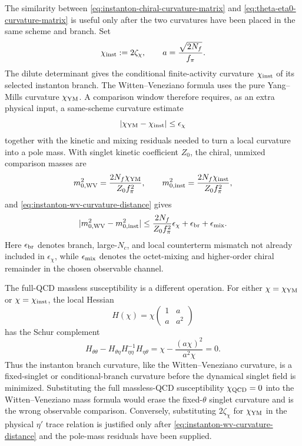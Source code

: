 \begin{controlledapproximation}
\label{ca:instanton-wv-comparison-window}
The similarity between \eqref{eq:instanton-chiral-curvature-matrix} and
\eqref{eq:theta-eta0-curvature-matrix} is useful only after the two
curvatures have been placed in the same scheme and branch.  Set
\[
  \chi_{\rm inst}:=2\zeta_\chi,
  \qquad
  a=\frac{\sqrt{2N_f}}{f_\pi}.
\]
The dilute determinant gives the conditional finite-activity curvature
\(\chi_{\rm inst}\) of its selected instanton branch.  The
Witten--Veneziano formula uses the pure Yang--Mills curvature
\(\chi_{\rm YM}\).  A comparison window therefore requires, as an extra
physical input, a same-scheme curvature estimate
\begin{equation}
  |\chi_{\rm YM}-\chi_{\rm inst}|\le \epsilon_\chi
  \label{eq:instanton-wv-curvature-distance}
\end{equation}
together with the kinetic and mixing residuals needed to turn a local
curvature into a pole mass.  With singlet kinetic coefficient \(Z_0\), the
chiral, unmixed comparison masses are
\[
  m_{0,{\rm WV}}^2
  =
  \frac{2N_f\chi_{\rm YM}}{Z_0f_\pi^2},
  \qquad
  m_{0,{\rm inst}}^2
  =
  \frac{2N_f\chi_{\rm inst}}{Z_0f_\pi^2},
\]
and \eqref{eq:instanton-wv-curvature-distance} gives
\begin{equation}
  |m_{0,{\rm WV}}^2-m_{0,{\rm inst}}^2|
  \le
  \frac{2N_f}{Z_0f_\pi^2}\epsilon_\chi
  +\epsilon_{\rm br}+\epsilon_{\rm mix}.
  \label{eq:instanton-wv-mass-comparison-bound}
\end{equation}
Here \(\epsilon_{\rm br}\) denotes branch, large-\(N_c\), and local
counterterm mismatch not already included in \(\epsilon_\chi\), while
\(\epsilon_{\rm mix}\) denotes the octet-mixing and higher-order chiral
remainder in the chosen observable channel.

The full-QCD massless susceptibility is a different operation.  For either
\(\chi=\chi_{\rm YM}\) or \(\chi=\chi_{\rm inst}\), the local Hessian
\[
  H(\chi)
  =
  \chi
  \begin{pmatrix}
    1&a\\
    a&a^2
  \end{pmatrix}
\]
has the Schur complement
\begin{equation}
  H_{\theta\theta}
  -
  H_{\theta\eta}H_{\eta\eta}^{-1}H_{\eta\theta}
  =
  \chi-\frac{(a\chi)^2}{a^2\chi}
  =
  0 .
  \label{eq:instanton-wv-massless-schur-zero}
\end{equation}
Thus the instanton branch curvature, like the Witten--Veneziano curvature, is
a fixed-singlet or conditional-branch curvature before the dynamical singlet
field is minimized.  Substituting the full massless-QCD susceptibility
\(\chi_{\rm QCD}=0\) into the Witten--Veneziano mass formula would erase the
fixed-\(\theta\) singlet curvature and is the wrong observable comparison.
Conversely, substituting \(2\zeta_\chi\) for \(\chi_{\rm YM}\) in the physical
\(\eta'\) trace relation is justified only after
\eqref{eq:instanton-wv-curvature-distance} and the pole-mass residuals have
been supplied.


\end{controlledapproximation}

